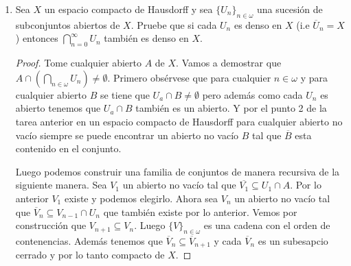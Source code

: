 \documentclass[letter,twoside,12pt]{article}
\begin{document}
\begin{enumerate}
\begin{proof}
Ahora para demostrar que esta función es continua utilizando el punto 4 de la tarea anterior necesitamos que $ \beta\mathbb{N} $ sea compacto y de Hausdorff. Lo primero esta dado por el punto anterior. Lo segundo se tiene porque si tomamos dos ultrafiltros tales que $ \mathcal{U}_{1} \not = \mathcal{U}_{2} $, entonces podemos suponer sin pérdida de generalidad que existe $ X \in \mathcal{U}_1 $ tal que $ X \not \in \mathcal{U}_2 $. Pero por propiedades de ultrafiltros tenemos que $\mathbb{N} \backslash X \in \mathcal{U}_2 $. Luego tenemos que $ \mathcal{U}_1 \in [X] $ y $ \mathcal{U}_2 \in [\mathbb{N}\backslash X]$ y por la primera parte de la demostración del segundo punto de esta tarea tenemos que estos vecindarios son complementos entre sí y por lo tanto disyuntos. Luego $ \beta \mathbb{N} $ es compacto y de Hausdorff y por el punto cuatro de la tarea anterior concluimos que $ g $ es continua.


\end{proof}

\item Sea $ X $ un espacio compacto de Hausdorff y sea $ \{U_n\}_{n \in \omega} $ una sucesión de subconjuntos abiertos de $ X $. Pruebe que si cada $ U_n $ es denso en $ X $ (i.e $ \overline{U}_n = X $) entonces $ \bigcap_{n=0}^{\infty} U_n $ también es denso en $ X $.

\begin{proof}
Tome cualquier abierto $ A $ de $ X $. Vamos a demostrar que $ A \cap (\bigcap_{n \in \omega} U_n) \not  = \emptyset  $. Primero obsérvese que para cualquier $ n \in \omega $ y para cualquier abierto $ B $ se tiene que $ U_a \cap B \not = \emptyset$ pero además como cada $ U_n $ es abierto tenemos que $ U_a \cap B $ también es un abierto. Y por el punto 2 de la tarea anterior en un espacio compacto de Hausdorff para cualquier abierto no vacío siempre se puede encontrar un abierto no vacío $ B $ tal que $ \overline{B} $ esta contenido en el conjunto.

Luego podemos construir una familia de conjuntos de manera recursiva de la siguiente manera. Sea $ V_1 $ un abierto no vacío tal que $ \overline{V_1} \subseteq U_1 \cap A  $. Por lo anterior $ V_1 $ existe y podemos elegirlo. Ahora sea $ V_n $ un abierto no vacío tal que $ \overline{V}_{n} \subseteq V_{n-1} \cap U_n $ que también existe por lo anterior. Vemos por construcción que $ V_{n+1} \subseteq V_{n} $. Luego $ \{V\}_{n \in \omega} $ es una cadena con el orden de contenencias. Además tenemos que $ \overline{V}_n \subseteq \overline{V}_{n+1}$ y cada $ \overline{V}_n $ es un subesapcio cerrado y por lo tanto compacto de $ X $.


\end{proof}
\end{enumerate}
\end{document}

